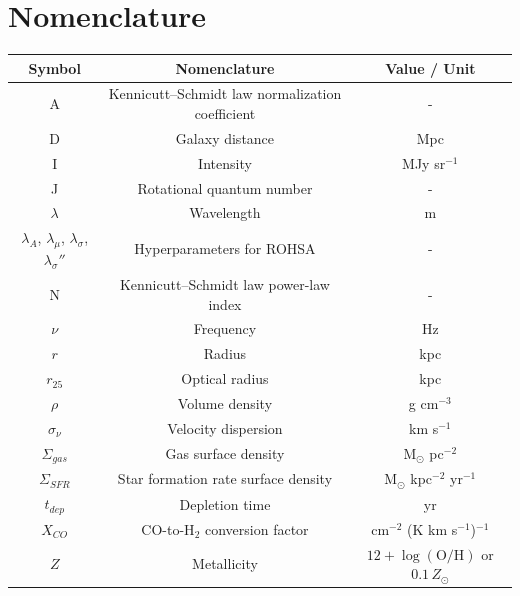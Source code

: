 \section*{{Nomenclature}}
\begingroup
\renewcommand{\arraystretch}{1.1}
\begin{table}[H]
	\centering
	\begin{tabular}{|c|c|c|}
		\hline
			Symbol & Nomenclature &Value / Unit\\
		\hline
			A & Kennicutt--Schmidt law normalization coefficient & - \\
			D & Galaxy distance & Mpc \\
			I & Intensity & MJy sr$^{-1}$ \\
			J & Rotational quantum number & - \\
			$\lambda$ & Wavelength & m \\
			$\lambda_A$, $\lambda_\mu$, $\lambda_\sigma$, $\lambda_\sigma''$ & Hyperparameters for ROHSA & - \\
			N & Kennicutt--Schmidt law power-law index & - \\
			$\nu$ & Frequency & Hz \\
			$r$ & Radius & kpc \\
			$r_{25}$ & Optical radius & kpc \\
			$\rho$ & Volume density & g cm$^{-3}$ \\
			$\sigma_\nu$ & Velocity dispersion & km s$^{-1}$ \\
			$\Sigma_{  gas}$ & Gas surface density & M$_\odot$ pc$^{-2}$ \\
			$\Sigma_{  SFR}$ & Star formation rate surface density & M$_\odot$ kpc$^{-2}$ yr$^{-1}$ \\
			$t_{dep}$ & Depletion time & yr \\
			$X_{  CO}$ & CO-to-H$_2$ conversion factor & cm$^{-2}$ (K km s$^{-1}$)$^{-1}$ \\
			$Z$ & Metallicity & $12 + \log(\mathrm{O/H})$ or $0.1\,Z_\odot$ \\
		\hline
	\end{tabular}
\end{table}
\endgroup